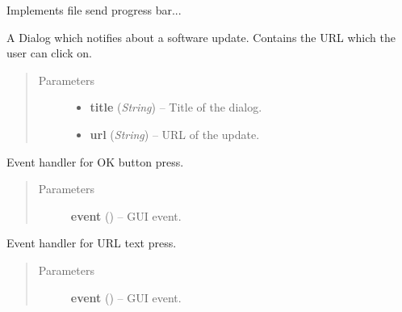 \documentclass[letterpaper,10pt,english]{sphinxmanual}
\begin{document}

\begin{fulllineitems}
\label{dialogs:dialogs.SendProgressBar}
Implements file send progress bar...

\end{fulllineitems}


\begin{fulllineitems}
\label{dialogs:dialogs.UpdateDialog}
A Dialog which notifies about a software update.
Contains the URL which the user can click on.
\begin{quote}\begin{description}
\item[{Parameters}] \leavevmode\begin{itemize}
\item {} 
\textbf{title} (\emph{String}) -- Title of the dialog.

\item {} 
\textbf{url} (\emph{String}) -- URL of the update.

\end{itemize}

\end{description}\end{quote}

\begin{fulllineitems}
\label{dialogs:dialogs.UpdateDialog.OnOk}
Event handler for OK button press.
\begin{quote}\begin{description}
\item[{Parameters}] \leavevmode
\textbf{event} () -- GUI event.

\end{description}\end{quote}

\end{fulllineitems}


\begin{fulllineitems}
\label{dialogs:dialogs.UpdateDialog.UrlHandler}
Event handler for URL text press.
\begin{quote}\begin{description}
\item[{Parameters}] \leavevmode
\textbf{event} () -- GUI event.


\end{description}
\end{quote}
\end{fulllineitems}
\end{fulllineitems}
\end{document}
